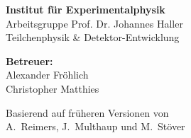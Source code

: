 \begin{vplace}
\scshape

\textbf{Institut für Experimentalphysik} \\
Arbeitsgruppe Prof. Dr. Johannes Haller \\
Teilchenphysik \& Detektor-Entwicklung\par\bigskip

\textbf{Betreuer:} \\
Alexander Fröhlich \\
Christopher Matthies\par\bigskip

Basierend auf früheren Versionen von \\
A.~Reimers, J.~Multhaup und M.~Stöver

\end{vplace}
